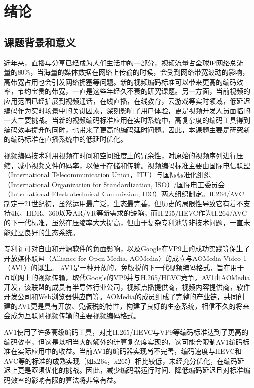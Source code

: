 
\chapter{绪论}
\section{课题背景和意义}

近年来，直播与分享已经成为人们生活中的一部分，视频流量占全球IP网络总流量的80\%\cite{CiscoVisualNetworking2018}，当海量的媒体数据在网络上传输的时候，会受到网络带宽波动的影响，高带宽占用也会引发网络拥塞等问题。新的视频编码标准可以带来更高的编码效率，节约宝贵的带宽，一直是这些年经久不衰的研究课题。另一方面，当前视频的应用范围已经扩展到视频通话，在线直播，在线教育，云游戏等实时领域，低延迟编码作为实时场景中的关键因素，深刻影响了用户体验，更是视频开发人员面临的一大主要挑战\cite{BitmovinVideoDeveloper2019}。当新的视频编码标准应用在实时系统中，高复杂度的编码工具得到编码效率提升的同时，也带来了更高的编码延时问题。因此，本课题主要是研究新的编码标准在直播系统中的低延时优化。

视频编码技术利用视频在时间和空间维度上的冗余性，对原始的视频序列进行压缩，减小视频文件的码率，以便于存储和传输。视频编码标准主要由国际电信联盟（International Telecommunication Union，ITU）与国际标准化组织（International Organization for Standardization, ISO）/国际电工委员会（International Electrotechnical Commission, IEC）两大组织制定。H.264/AVC制定于21世纪初，虽然运用最广泛，生态最完善，但历史的局限性导致它有着不支持4K、HDR、360以及AR/VR等新需求的缺陷，而H.265/HEVC作为H.264/AVC的下一代标准，虽然在压缩率大大提高，但由于复杂专利池等非技术问题，一直未能建立良好的生态系统。

专利许可对自由和开源软件的负面影响，以及Google在VP9上的成功实践等促生了开放媒体联盟（Alliance for Open Media, AOMedia）的成立与AOMedia Video 1（AV1）的诞生。 AV1是一种开放的，免版税的下一代视频编码格式，旨在用于互联网上的视频传输，取代Google的VP9并与H.265/HEVC竞争。AV1由AOMedia开发，该联盟的成员有半导体行业公司，视频点播提供商，视频内容提供商，软件开发公司和Web浏览器供应商等。AOMedia的成员组成了完整的产业链，共同创建的AV1更是具有开放、免版税的特性，构建了良好的生态系统，相信不久的将来会成为互联网视频传输的主要视频编码格式。

AV1使用了许多高级编码工具\cite{chenOverviewCoreCoding2018}，对比H.265/HEVC与VP9等编码标准达到了更高的编码效率\cite{laudeComparisonJEMAV12018,akyaziComparisonCompressionEfficiency2018}，但这是以相当大的额外的计算复杂度实现的，这可能会限制AV1编码标准在实际应用中的收益。当前AV1的编码器实现尚不完善，编码速度与HEVC和AVC等的标准的成熟实现（如x264，x265）相比较低，未经充分优化，在编码延迟上更是亟须优化的挑战。因此，减少编码器运行时间、降低编码延迟且对标准编码效率的影响有限的算法将非常有益。

